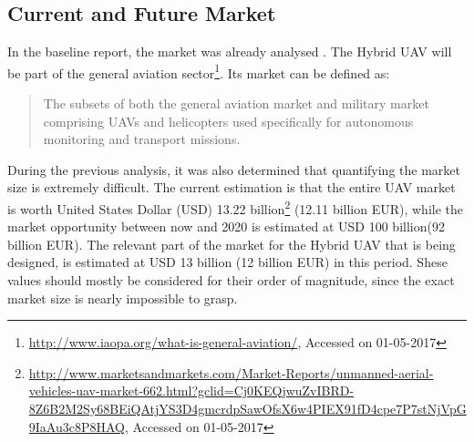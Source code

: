 \subsection{Current and Future Market}
\label{sec:curr_futu_mark}

In the baseline report, the market was already analysed \cite{baseline}. The Hybrid UAV will be part of the general aviation  sector\footnote{\url{http://www.iaopa.org/what-is-general-aviation/}, Accessed on 01-05-2017}. Its market can be defined as:

\begin{quote}
\begin{itshape}
The subsets of both the general aviation market and military market comprising UAVs and helicopters used specifically for autonomous monitoring and transport missions.
\end{itshape}
\end{quote}

During the previous analysis, it was also determined that quantifying the market size is extremely difficult. The current estimation is that the entire UAV market is worth United States Dollar (USD) 13.22 billion\footnote{\url{http://www.marketsandmarkets.com/Market-Reports/unmanned-aerial-vehicles-uav-market-662.html?gclid=Cj0KEQjwuZvIBRD-8Z6B2M2Sy68BEiQAtjYS3D4gmcrdpSawOfsX6w4PIEX91fD4cpe7P7stNjVpG9IaAu3c8P8HAQ}, Accessed on 01-05-2017} (12.11 billion EUR), while the market opportunity between now and 2020 is estimated at USD 100 billion\footnotemark (92 billion EUR\footnotemark). The relevant part of the market for the Hybrid UAV that is being designed, is estimated at USD 13 billion (12 billion EUR) in this period\footnotemark. Shese values should mostly be considered for their order of magnitude, since the exact market size is nearly impossible to grasp. %






